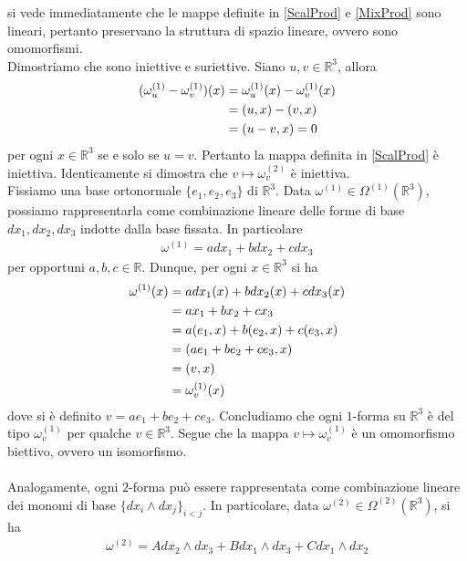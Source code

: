 \documentclass[twoside, 11pt]{amsbook}
\makeatletter
\newcommand{\0}{{(0)}}
\newcommand{\3}{{(3)}}
\theoremstyle{colonplain}
\theoremstyle{colondefinition}
\theoremstyle{colonremark}
\numberwithin{equation}{chapter}
\renewcommand{\proofname}{Dimostrazione}
\renewenvironment{proof}[1][\proofname]{\par
  \pushQED{\qed}%
  \normalfont \topsep6\p@\@plus6\p@\relax
  \trivlist
  \item[\hskip\labelsep\bfseries #1:]\ignorespaces
}{%
  \popQED\endtrivlist\@endpefalse
}
\makeatother
\begin{document}
\begin{proof} si vede immediatamente che le mappe definite in \eqref{ScalProd} e \eqref{MixProd} sono lineari, pertanto preservano la struttura di spazio lineare, ovvero sono omomorfismi. \\
Dimostriamo che sono iniettive e suriettive. Siano $u, v \in \mathbb{R}^3$, allora 
\begin{align}
    (\omega^{(1)}_u - \omega^{(1)}_v)(x) &= \omega^{(1)}_u(x) - \omega^{(1)}_v(x) \notag \\
    &= (u, x) - (v, x) \notag \\
    &= (u - v, x) = 0 \notag
\end{align}
per ogni $x \in \mathbb{R}^3$ se e solo se $u = v$. Pertanto la mappa definita in \eqref{ScalProd} è iniettiva. Identicamente si dimostra che $v \mapsto \omega^{(2)}_v$ è iniettiva. \\
Fissiamo una base ortonormale $\{e_1, e_2, e_3\}$ di $\mathbb{R}^3$. Data $\omega^{(1)} \in \Omega^{(1)}(\mathbb{R}^3)$, possiamo rappresentarla come combinazione lineare delle forme di base $dx_1, dx_2, dx_3$ indotte dalla base fissata. In particolare 
\begin{align}
    \omega^{(1)} = adx_1 + bdx_2 + cdx_3
\end{align}
per opportuni $a, b, c \in \mathbb{R}$. Dunque, per ogni $x \in \mathbb{R}^3$ si ha
\begin{align}
    \omega^{(1)}(x) &= adx_1(x) + bdx_2(x) + cdx_3(x) \notag \\
    &= ax_1 + bx_2 + cx_3 \notag \\
    &= a(e_1, x) + b(e_2, x) + c(e_3, x) \notag \\
    &= (ae_1 + be_2 + ce_3, x) \notag \\
    &= (v, x) \notag \\
    &= \omega^{(1)}_v(x)
\end{align}
dove si è definito $v = ae_1 + be_2 + ce_3$. Concludiamo che ogni $1$-forma su $\mathbb{R}^3$ è del tipo $\omega^{(1)}_v$ per qualche $v \in \mathbb{R}^3$. Segue che la mappa $v \mapsto \omega^{(1)}_v$ è un omomorfismo biettivo, ovvero un isomorfismo. \\ \\
Analogamente, ogni $2$-forma può essere rappresentata come combinazione lineare dei monomi di base $\{dx_i \wedge dx_j\}_{i < j}$. In particolare, data $\omega^{(2)} \in \Omega^{(2)}(\mathbb{R}^3)$, si ha 
\begin{align}
    \omega^{(2)} = Adx_2 \wedge dx_3 + Bdx_1 \wedge dx_3 + Cdx_1 \wedge dx_2

\end{align}
\end{proof}
\end{document}
